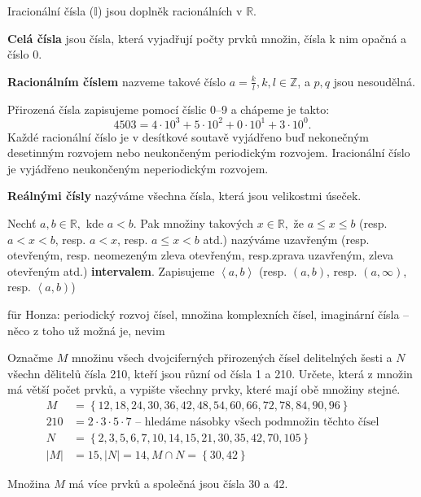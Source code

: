 Iracionální čísla ($\mathbb{I}$) jsou doplněk racionálních v $\mathbb{R}$.

\begin{definition}
  \textbf{Celá čísla} jsou čísla, která vyjadřují počty prvků množin, čísla k nim opačná a číslo 0.
\end{definition}

\begin{definition}
  \textbf{Racionálním číslem} nazveme takové číslo $a = \frac{k}{l}, k, l \in \mathbb{Z}$, a $p,q$ jsou nesoudělná.
\end{definition}

\begin{pozn}
  Přirozená čísla zapisujeme pomocí číslic 0--9 a chápeme je takto:
  $$4503=4\cdot 10^3+5\cdot 10^2 + 0 \cdot 10^1 + 3\cdot 10^0.$$
  Každé racionální číslo je v desítkové soutavě vyjádřeno buď nekonečným desetinným rozvojem nebo neukončeným periodickým rozvojem. Iracionální číslo je vyjádřeno neukončeným neperiodickým rozvojem.
\end{pozn}

\begin{definition}
  \textbf{Reálnými čísly} nazýváme všechna čísla, která jsou velikostmi úseček.
\end{definition}

\begin{definition}
  Nechť $a,b \in \mathbb{R},$ kde $a<b$. Pak množiny takových $x\in \mathbb{R},$ že $a\leq x\leq b$ (resp. $a < x < b$, resp. $a < x$, resp. $a \leq x < b$ atd.) nazýváme uzavřeným (resp. otevřeným, resp. neomezeným zleva otevřeným, resp.zprava uzavřeným, zleva otevřeným atd.) \textbf{intervalem}. Zapisujeme $\left<a,b\right>$ (resp. $\left(a,b\right)$, resp. $(a, \infty)$, resp. $\left<a, b\right)$)
\end{definition}

für Honza: periodický rozvoj čísel, množina komplexních čísel, imaginární čísla -- něco z toho už možná je, nevim

\begin{example}[SÚM 169/8]
  Označme $M$ množinu všech dvojciferných přirozených čísel delitelných šesti a $N$ všechn dělitelů čísla 210, kteří jsou různí od čísla 1 a 210. Určete, která z množin má větší počet prvků, a vypište všechny prvky, které mají obě množiny stejné.
  \begin{align*}
    M & = \left\{12, 18, 24, 30, 36, 42, 48, 54, 60, 66, 72, 78, 84, 90, 96\right\}\\
    210 & = 2\cdot 3 \cdot 5  \cdot 7 \textrm{ -- hledáme násobky všech podmnožin těchto čísel} \\
    N  & = \left\{2,3,5,6,7, 10, 14, 15, 21, 30, 35, 42, 70, 105\right\} \\
    |M| & = 15, |N| = 14, M \cap N = \left\{30, 42\right\}
  \end{align*}

  \rm Množina $M$ má více prvků a společná jsou čísla 30 a 42.
\end{example}

